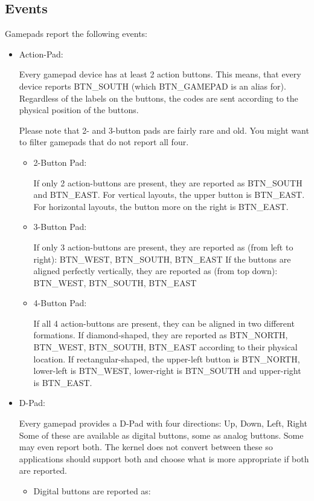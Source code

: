 \documentclass[a4paper,8pt,english]{sphinxmanual}
\begin{document}
\subsection{Events}
\label{input/gamepad:events}
Gamepads report the following events:
\begin{itemize}
\item {} 
Action-Pad:

Every gamepad device has at least 2 action buttons. This means, that every
device reports BTN\_SOUTH (which BTN\_GAMEPAD is an alias for). Regardless
of the labels on the buttons, the codes are sent according to the
physical position of the buttons.

Please note that 2- and 3-button pads are fairly rare and old. You might
want to filter gamepads that do not report all four.
\begin{itemize}
\item {} 
2-Button Pad:

If only 2 action-buttons are present, they are reported as BTN\_SOUTH and
BTN\_EAST. For vertical layouts, the upper button is BTN\_EAST. For
horizontal layouts, the button more on the right is BTN\_EAST.

\item {} 
3-Button Pad:

If only 3 action-buttons are present, they are reported as (from left
to right): BTN\_WEST, BTN\_SOUTH, BTN\_EAST
If the buttons are aligned perfectly vertically, they are reported as
(from top down): BTN\_WEST, BTN\_SOUTH, BTN\_EAST

\item {} 
4-Button Pad:

If all 4 action-buttons are present, they can be aligned in two
different formations. If diamond-shaped, they are reported as BTN\_NORTH,
BTN\_WEST, BTN\_SOUTH, BTN\_EAST according to their physical location.
If rectangular-shaped, the upper-left button is BTN\_NORTH, lower-left
is BTN\_WEST, lower-right is BTN\_SOUTH and upper-right is BTN\_EAST.

\end{itemize}

\item {} 
D-Pad:

Every gamepad provides a D-Pad with four directions: Up, Down, Left, Right
Some of these are available as digital buttons, some as analog buttons. Some
may even report both. The kernel does not convert between these so
applications should support both and choose what is more appropriate if
both are reported.
\begin{itemize}
\item {} 
Digital buttons are reported as:


\end{itemize}
\end{itemize}
\end{document}
